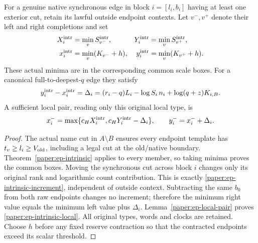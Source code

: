 \begin{corollary}\label{paper:ep-intrinsic-pair}
For a genuine native synchronous edge in block $i=[l_i,b_i]$ having
at least one exterior cut, retain its lawful outside endpoint contexts.
Let $v^-,v^+$ denote their left and right completions and set
\begin{align*}
 X_i^{\rm intr}&=\min_vS_{v^-}^{\rm intr},&
 Y_i^{\rm intr}&=\min_vS_{v^+}^{\rm intr},\\
 x_i^{\rm intr}&=\min_v(K_{v^-}+h),&
 y_i^{\rm intr}&=\min_v(K_{v^+}+h).
\end{align*}
These actual minima are in the corresponding common scale boxes.
For a canonical full-to-deepest-$q$ edge they satisfy
\begin{equation}\label{paper:ep-intrinsic-increment}
 y_i^{\rm intr}-x_i^{\rm intr}
 =\Delta_i=(r_i-q)L_i-\log S_i\,n_i
                             +\log(q+z)K_{i,B}.
\end{equation}
A sufficient local pair, reading only this original local type, is
\begin{equation}\label{paper:ep-intrinsic-local}
 x_i^- =\max\{c_HX_i^{\rm intr},c_HY_i^{\rm intr}-\Delta_i\},
 \qquad y_i^-=x_i^-+\Delta_i.
\end{equation}
\end{corollary}
\begin{proof}
The actual name cut in $A\setminus B$ ensures every endpoint template
has $t_v\geq l_i\geq V_{\rm old}$, including a legal cut at the
old/native boundary.  Theorem~\ref{paper:ep-intrinsic} applies to
every member, so taking minima proves the common boxes.
Moving the synchronous cut across block $i$ changes only its original
rank and logarithmic count contribution.  This is exactly
\eqref{paper:ep-intrinsic-increment}, independent of outside context.
Subtracting the same $b_0$ from both raw endpoints changes no increment;
therefore the minimum right value equals the minimum left value plus
$\Delta_i$.  Lemma~\ref{paper:ep-local-pair} proves
\eqref{paper:ep-intrinsic-local}.  All original types, words and clocks
are retained.  Choose $h$ before any fixed reserve contraction so that
the contracted endpoints exceed its scalar threshold.
\end{proof}

